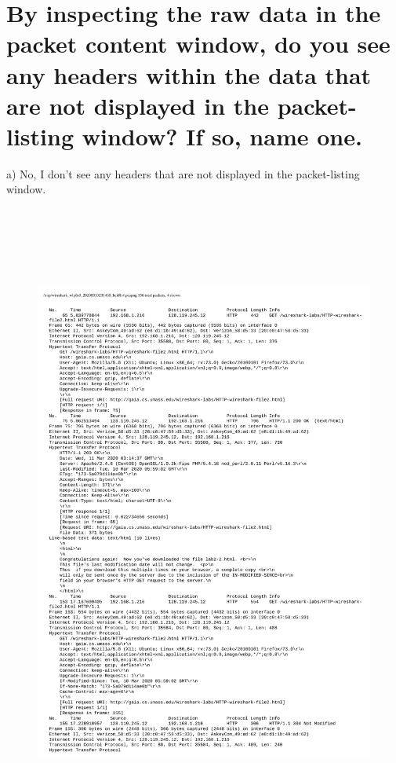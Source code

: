 \documentclass{article}
\begin{document}
\section{By inspecting the raw data in the packet content window, do you see any headers
within the data that are not displayed in the packet-listing window? If so, name
one.}
a)  No, I don't see any headers that are not displayed in the packet-listing window.
\newline \\
\newline \\
\newline \\
\newline \\
\newline \\
\newline \\
\begin{figure}[h!]
\centering
\includegraphics[scale=0.40]{Q8-11Output.pdf}
\caption{}
\end{figure}
\end{document}

